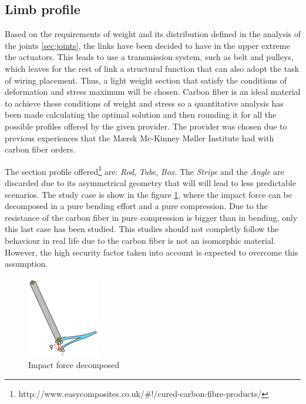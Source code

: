 \subsection{Limb profile} %
\label{sub:limb_profile}
Based on the requirements of weight and its distribution defined in the analysis of the joints \ref{sec:joints}, the links have been decided to have in the upper extreme the actuators. 
This leads to use a transmission system, such as belt and pulleys, which leaves for the rest of link a structural function that can also adopt the task of wiring placement.
Thus, a light weight section that satisfy the conditions of deformation and stress maximum will be chosen.
Carbon fiber is an ideal material to achieve these conditions of weight and stress so a quantitative analysis has been made calculating the optimal solution and then rounding it for all the possible profiles offered by the given provider.
The provider was chosen due to previous experiences that the Mærsk Mc-Kinney Møller Institute had with carbon fiber orders.

The section profile offered\footnote{http://www.easycomposites.co.uk/\#!/cured-carbon-fibre-products/} are: \textit{Rod}, \textit{Tube}, \textit{Box}. The \textit{Stripe} and the \textit{Angle} are discarded due to its asymmetrical geometry that will will lead to less predictable scenarios.
The study case is show in the figure \ref{fig:impact_decomposition}, where the impact force can be decomposed in a pure bending effort and a pure compression.
Due to the resistance of the carbon fiber in pure compression is bigger than in bending, only this last case has been studied.
This studies should not completly follow the behaviour in real life due to the carbon fiber is not an isomorphic material.
However, the high security factor taken into account is expected to overcome this assumption.

\begin{figure}[ht!]
  \centering
  \includegraphics[width=.3\textwidth]{figures/impact_decomposition.pdf}
  \caption{Impact force decomposed}
  \label{fig:impact_decomposition}
\end{figure}

